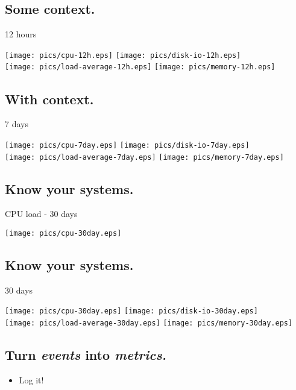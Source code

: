 \documentclass[xga]{xdvislides}
\begin{document}
\subsection{Some context.}
12 hours
\begin{center}
	\texttt{[image: pics/cpu-12h.eps]}
	\texttt{[image: pics/disk-io-12h.eps]} \\
	\texttt{[image: pics/load-average-12h.eps]}
	\texttt{[image: pics/memory-12h.eps]} \\
\end{center}

\subsection{With context.}
7 days
\begin{center}
	\texttt{[image: pics/cpu-7day.eps]}
	\texttt{[image: pics/disk-io-7day.eps]} \\
	\texttt{[image: pics/load-average-7day.eps]}
	\texttt{[image: pics/memory-7day.eps]} \\
\end{center}

\subsection{Know your systems.}
CPU load - 30 days
\begin{center}
	\texttt{[image: pics/cpu-30day.eps]}
\end{center}

\subsection{Know your systems.}
30 days
\begin{center}
	\texttt{[image: pics/cpu-30day.eps]}
	\texttt{[image: pics/disk-io-30day.eps]} \\
	\texttt{[image: pics/load-average-30day.eps]}
	\texttt{[image: pics/memory-30day.eps]} \\
\end{center}

\subsection{Turn {\em events} into {\em metrics.}}
\begin{itemize}
	\item Log it!
\end{itemize}
\end{document}
